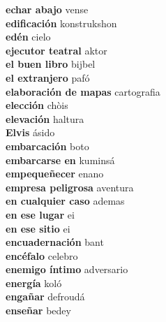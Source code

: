 \textbf{ echar abajo  } vense \\
\textbf{ edificación  } konstrukshon \\
\textbf{ edén  } cielo \\
\textbf{ ejecutor teatral  } aktor \\
\textbf{ el buen libro  } bijbel \\
\textbf{ el extranjero  } pafó \\
\textbf{ elaboración de mapas  } cartografia \\
\textbf{ elección  } chòis \\
\textbf{ elevación  } haltura \\
\textbf{ Elvis  } ásido \\
\textbf{ embarcación  } boto \\
\textbf{ embarcarse en  } kuminsá \\
\textbf{ empequeñecer  } enano \\
\textbf{ empresa peligrosa  } aventura \\
\textbf{ en cualquier caso  } ademas \\
\textbf{ en ese lugar  } ei \\
\textbf{ en ese sitio  } ei \\
\textbf{ encuadernación  } bant \\
\textbf{ encéfalo  } celebro \\
\textbf{ enemigo íntimo  } adversario \\
\textbf{ energía  } koló \\
\textbf{ engañar  } defroudá \\
\textbf{ enseñar  } bedey \\
